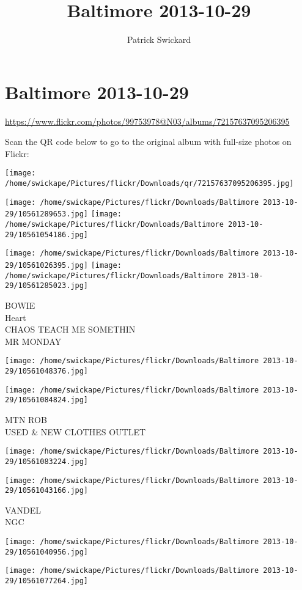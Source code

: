 \documentclass[10pt,letterpaper]{article}
\title{Baltimore 2013-10-29}
\author{Patrick Swickard}
\date{}
\begin{document}
\section*{Baltimore 2013-10-29}

\url{https://www.flickr.com/photos/99753978@N03/albums/72157637095206395}

Scan the QR code below to go to the original album with full-size photos on Flickr:

\texttt{[image: /home/swickape/Pictures/flickr/Downloads/qr/72157637095206395.jpg]}
\pagebreak

\texttt{[image: /home/swickape/Pictures/flickr/Downloads/Baltimore 2013-10-29/10561289653.jpg]}
\texttt{[image: /home/swickape/Pictures/flickr/Downloads/Baltimore 2013-10-29/10561054186.jpg]}

\texttt{[image: /home/swickape/Pictures/flickr/Downloads/Baltimore 2013-10-29/10561026395.jpg]}
\texttt{[image: /home/swickape/Pictures/flickr/Downloads/Baltimore 2013-10-29/10561285023.jpg]}

BOWIE\\
Heart\\
CHAOS TEACH ME SOMETHIN\\
MR MONDAY
\pagebreak

\texttt{[image: /home/swickape/Pictures/flickr/Downloads/Baltimore 2013-10-29/10561048376.jpg]}

\vspace{0.25in}
\texttt{[image: /home/swickape/Pictures/flickr/Downloads/Baltimore 2013-10-29/10561084824.jpg]}

MTN ROB\\
USED \& NEW CLOTHES OUTLET
\pagebreak

\texttt{[image: /home/swickape/Pictures/flickr/Downloads/Baltimore 2013-10-29/10561083224.jpg]}

\vspace{0.25in}
\texttt{[image: /home/swickape/Pictures/flickr/Downloads/Baltimore 2013-10-29/10561043166.jpg]}

VANDEL\\
NGC
\pagebreak

\texttt{[image: /home/swickape/Pictures/flickr/Downloads/Baltimore 2013-10-29/10561040956.jpg]}

\vspace{0.25in}
\texttt{[image: /home/swickape/Pictures/flickr/Downloads/Baltimore 2013-10-29/10561077264.jpg]}
\end{document}
